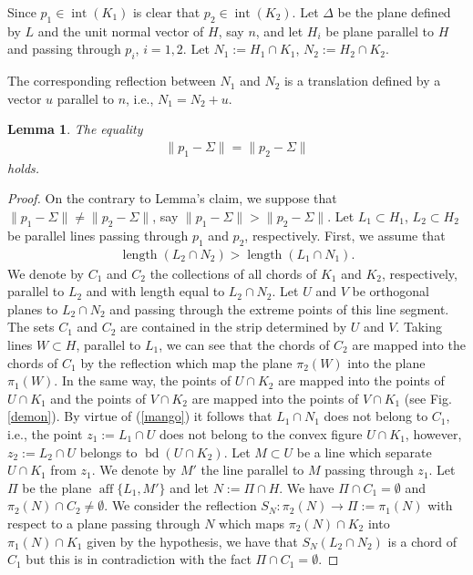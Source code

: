 \documentclass[12pt]{article}
\newcommand{\len}{\operatorname*{length}}
\newcommand{\bd}{\operatorname*{bd}}
\newcommand{\aff}{\operatorname*{aff}}
\newtheorem{lemma}{Lemma}
\begin{document}
Since $p_{1}\in \operatorname{int}(K_{1})$ is clear that $p_{2}\in \operatorname{int}( K_{2})$. Let $\Delta$ be the plane defined by $L$ and the unit normal vector of $H$, say $n$, and let $H_{i}$ be plane parallel to $H$ and passing through $p_{i}$, $i=1,2$. Let $N_1:=H_1 \cap K_1$, $N_2:=H_2 \cap K_2$.

The corresponding reflection between $N_{1}$ and $N_{2}$ is a translation defined by a vector $u$ parallel to $n$, i.e., $N_1=N_2+u$.
\begin{lemma}\label{dey}
The equality 
\begin{eqnarray}\label{trinidad}
\| p_1- \Sigma \|= \| p_{2}- \Sigma \|
\end{eqnarray}
holds.
\end{lemma}
\begin{proof}
On the contrary to Lemma's claim, we suppose that $\|p_1-\Sigma\| \not= \|p_{2}-\Sigma\|$, say $\|p_1-\Sigma\| > \|p_{2}-\Sigma\|$. Let $L_1 \subset H_1$, $L_2 \subset H_2$ be parallel lines passing through $p_1$ and $p_2$, respectively. First, we assume that 
\begin{eqnarray}\label{mango}
\len(L_2 \cap N_2)  > \len(L_1 \cap  N_1).
\end{eqnarray}
We denote by $C_1$ and $C_2$ the collections of all chords of $K_1$ and $K_2$, respectively, parallel to $L_2$ and with length equal to $L_2 \cap N_2$. Let $U$ and $V$ be orthogonal planes to $L_2 \cap N_2$ and passing through the extreme points of this line segment. The sets $C_1$ and $C_2$ are contained in the strip determined by $U$ and $V$. Taking lines $W\subset H$, parallel to $L_1$, we can see that the chords of $C_2$ are mapped into the chords of $C_1$ by the reflection which map the plane $\pi_2(W)$ into the plane $\pi_1(W)$. In the same way, the points of $ U \cap K_2$ are mapped into the points of $ U \cap K_1$ and the points of $V \cap K_2$ are mapped into the points of $V \cap K_1$ (see Fig. \ref{demon}). By virtue of (\ref{mango}) it follows that $L_1 \cap  N_1$ does not belong to $C_1$, i.e., the point $z_1:=L_1\cap U $ does not belong to the convex figure $U \cap K_1$, however, $z_2:=L_2\cap U$ belongs to $\bd (U \cap K_2)$. Let $M\subset U $ be a line which separate $U \cap K_1$ from $z_1$. We denote by $M'$ the line parallel to $M$ passing through $z_1$. Let $\Pi$ be the plane $\aff \{L_1,M'\}$ and let $N:=\Pi \cap H$. We have $\Pi \cap C_1=\emptyset$ and $\pi_2(N)\cap C_2 \not= \emptyset.$ We consider the reflection $S_N:\pi_2(N) \rightarrow \Pi:=\pi_1(N)$ with respect to a plane passing through $N$ which maps $\pi_2(N)\cap K_2$ into $\pi_1(N)\cap K_1$ given by the hypothesis, we have that $S_N(L_2\cap  N_2)$ is a chord of $C_1$ but this is in contradiction with the fact $\Pi \cap C_1=\emptyset$.

\end{proof}
\end{document}
